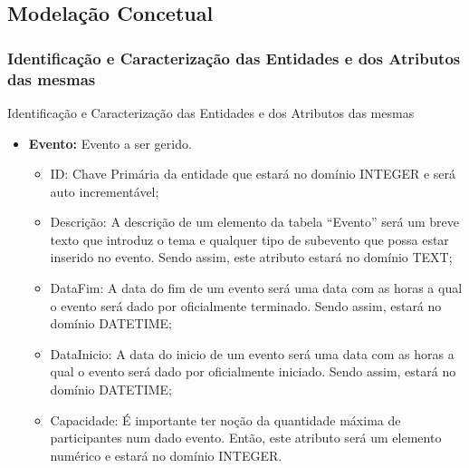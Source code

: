 \documentclass[compress,svgnames,handout,13.7pt]{beamer}
\begin{document}
\subsection{Modelação Concetual}
\subsubsection{Identificação e Caracterização das Entidades e dos Atributos das mesmas}
\begin{frame}{Identificação e Caracterização das Entidades e dos Atributos das mesmas}
\begin{itemize}
                 \item{\textbf{Evento:}} Evento a ser gerido. 
                     \begin{itemize}
                     \item{ID:} Chave Primária da entidade que estará no domínio INTEGER
                       e será auto incrementável;
                     \item{Descrição:} A descrição de um elemento da tabela ``Evento'' será
                       um breve texto que introduz o tema e qualquer tipo de subevento que possa
                       estar inserido no evento. Sendo assim, este atributo estará no domínio TEXT;
                     \item{DataFim:} A data do fim de um evento será uma data com as horas a qual
                       o evento será dado por oficialmente terminado. Sendo assim, estará no domínio
                       DATETIME;
                     \item{DataInicio:} A data do inicio de um evento será uma data com as horas a qual
                       o evento será dado por oficialmente iniciado. Sendo assim, estará no domínio
                       DATETIME;
                     \item{Capacidade:} É importante ter noção da quantidade máxima de participantes num
                       dado evento. Então, este atributo será um elemento numérico e estará no domínio INTEGER.
                     \end{itemize}
\end{itemize}
\end{frame}
\end{document}
